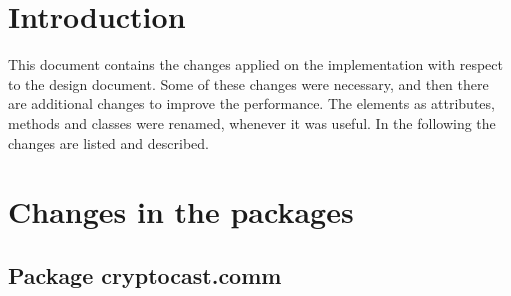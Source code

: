 \documentclass[a4paper,10pt]{scrartcl}
\title{\doctitle}
\author{\authorName}
\date{\today}
\begin{document}

\tableofcontents
\clearpage

\section{Introduction}
This document contains the changes applied on the implementation with respect to the design document.
Some of these changes were necessary, and then there are additional changes to improve the performance.
The elements as attributes, methods and classes were renamed, whenever it was useful. In the following the 
changes are listed and described.

\section{Changes in the packages}
\subsection{Package cryptocast.comm}
\end{document}
